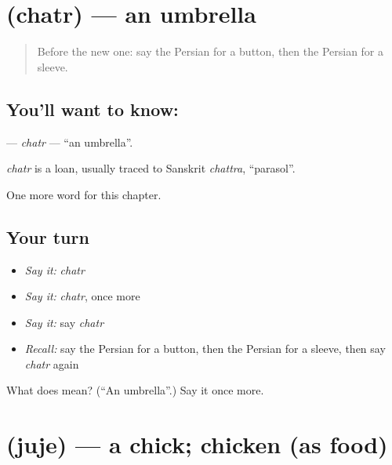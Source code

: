 \section[\texorpdfstring{\fa{چتر} (chatr)}{چتر (chatr)}]{ (chatr) — an umbrella}

\label{lesson:FA-C240-chatr}



\begin{quote}
Before the new one: say the Persian for a button, then the Persian for a sleeve.
\end{quote}

\subsection*{You'll want to know: }
\textbf{} — \emph{chatr} — \textquotedblleft{}an umbrella\textquotedblright{}.

\begin{cousinweb}
\emph{chatr} is a loan, usually traced to Sanskrit \emph{chattra}, \textquotedblleft{}parasol\textquotedblright{}.
\end{cousinweb}

\begin{grammarlens}[title={What you've built}]
One more word for this chapter.
\end{grammarlens}

\subsection*{Your turn}
\begin{itemize}
\raggedright
  \item \emph{Say it:} \emph{chatr}
  \item \emph{Say it:} \emph{chatr}, once more
  \item \emph{Say it:} say \emph{chatr}
  \item \emph{Recall:} say the Persian for a button, then the Persian for a sleeve, then say \emph{chatr} again
\end{itemize}

\begin{tcolorbox}[breakable,colback=teal!4,colframe=teal!35!black,title={Before you move on}]
What does  mean? (\textquotedblleft{}An umbrella\textquotedblright{}.) Say it once more.
\end{tcolorbox}
\section[\texorpdfstring{\fa{جوجه} (juje)}{جوجه (juje)}]{ (juje) — a chick; chicken (as food)}

